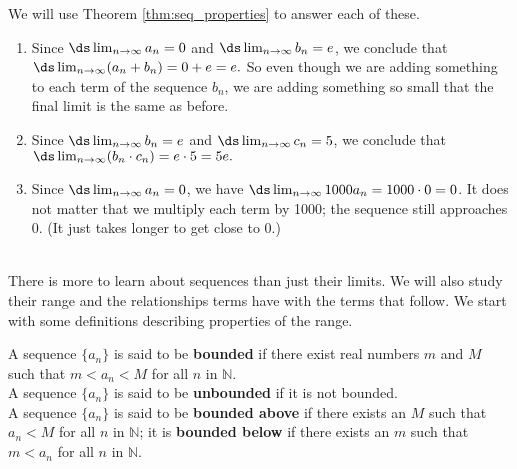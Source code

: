 {We will use Theorem \ref{thm:seq_properties} to answer each of these.
\begin{enumerate} 
\item		Since $\ds \lim_{n\to\infty} a_n = 0$ and $\ds \lim_{n\to\infty} b_n = e$, we conclude that $\ds \lim_{n\to\infty} (a_n+b_n) = 0+e = e.$ So even though we are adding something to each term of the sequence $b_n$, we are adding something so small that the final limit is the same as before.

\item		Since $\ds \lim_{n\to\infty} b_n = e$ and $\ds \lim_{n\to\infty} c_n = 5$, we conclude that $\ds \lim_{n\to\infty} (b_n\cdot c_n) = e\cdot 5 = 5e.$

\item		Since $\ds \lim_{n\to\infty} a_n = 0$, we have $\ds \lim_{n\to\infty} 1000a_n =1000\cdot 0 = 0$. It does not matter that we multiply each term by 1000; the sequence still approaches 0. (It just takes longer to get close to 0.)
\end{enumerate}
\baselineskip
}\\

There is more to learn about sequences than just their limits. We will also study their range and the relationships terms have with the terms that follow. We start with some definitions describing properties of the range.

{A sequence $\{a_n\}$ is said to be \textbf{bounded} if there exist real numbers $m$ and $M$ such that $m < a_n < M$ for all $n$ in $\mathbb{N}$.\\

A sequence $\{a_n\}$ is said to be \textbf{unbounded} if it is not bounded.\\

A sequence $\{a_n\}$ is said to be \textbf{bounded above} if there exists an $M$ such that $a_n < M$ for all $n$ in $\mathbb{N}$; it is \textbf{bounded below} if there exists an $m$ such that $m<a_n$ for all $n$ in $\mathbb{N}$.
}

